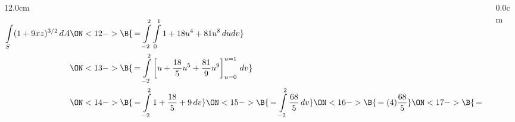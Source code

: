 \begin{frame}
\begin{columns}
\begin{column}{12.0cm}
\begin{align*} 
	\int \limits_{S} (1 + 9xz)^{3/2} \, dA
	&\ON<12->{\B{\, = \int \limits_{-2}^{2}\int \limits_{0}^{1} 1 + 18u^4 + 81u^8 \, dudv}} \\
	&\ON<13->{\B{\, = \int \limits_{-2}^{2} \left[u + \frac{18}{5}u^5 + \frac{81}{9}u^9 \right]_{u=0}^{u=1} \, dv}} \\
	&\ON<14->{\B{\, = \int \limits_{-2}^{2} 1 + \frac{18}{5} + 9 \, dv}}
	\ON<15->{\B{\, = \int \limits_{-2}^{2} \frac{68}{5} \, dv}}
	\ON<16->{\B{\, = (4)\frac{68}{5}}} 
	\ON<17->{\B{\, = 272}}
\end{align*}

\end{column}\begin{column}{0.0cm}\end{column}\end{columns}
\end{frame}

